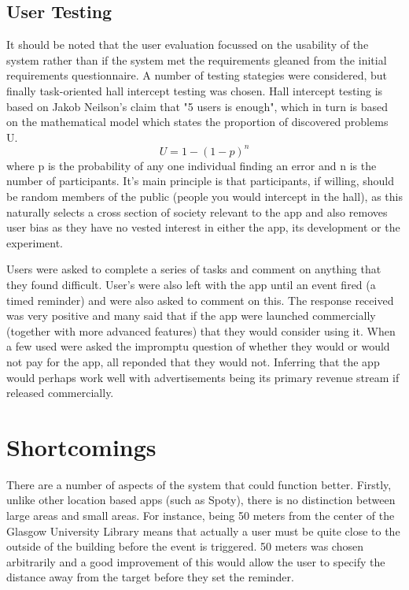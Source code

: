 \documentclass[12pt]{article} %
\begin{document}
\subsection{User Testing}

It should be noted that the user evaluation focussed on the usability of the system rather than if the system met the requirements gleaned from the initial requirements questionnaire. A number of testing stategies were considered, but finally task-oriented hall intercept testing was chosen. Hall intercept testing is based on Jakob Neilson's claim that "5 users is enough", which in turn is based on the mathematical model which states the proportion of discovered problems U. \[ U = 1 - (1 - p)^n  \] where p is the probability of any one individual finding an error and n is the number of participants. It's main principle is that participants, if willing, should be random members of the public (people you would intercept in the hall), as this naturally selects a cross section of society relevant to the app and also removes user bias as they have no vested interest in either the app, its development or the experiment.

Users were asked to complete a series of tasks and comment on anything that they found difficult. User's were also left with the app until an event fired (a timed reminder) and were also asked to comment on this.  The response received was very positive and many said that if the app were launched commercially (together with more advanced features) that they would consider using it. When a few used were asked the impromptu question of whether they would or would not pay for the app, all reponded that they would not. Inferring that the app would perhaps work well with advertisements being its primary revenue stream if released commercially.

\section{Shortcomings}

There are a number of aspects of the system that could function better. Firstly, unlike other location based apps (such as Spoty), there is no distinction between large areas and small areas. For instance, being 50 meters from the center of the Glasgow University Library means that actually a user must be quite close to the outside of the building before the event is triggered. 50 meters was chosen arbitrarily and a good improvement of this would allow the user to specify the distance away from the target before they set the reminder.
\end{document}
